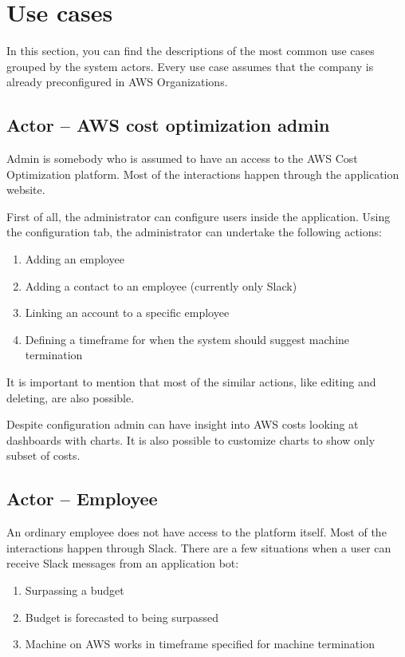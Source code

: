\documentclass[licencjacka,en]{thesisclass}
\begin{document}
    \section{Use cases}

    In this section, you can find the descriptions of the most common use cases
    grouped by the system actors.
    Every use case assumes that the company is already
    preconfigured in AWS Organizations.

    \subsection{Actor -- AWS cost optimization admin}

    Admin is somebody who is assumed to have an access to the AWS Cost Optimization platform.
    Most of the interactions happen through the application website.

    First of all, the administrator can configure users inside the application.
    Using the configuration tab, the administrator can undertake the following actions:

    \begin{enumerate}
        \item Adding an employee
        \item Adding a contact to an employee (currently only Slack)
        \item Linking an account to a specific employee
        \item Defining a timeframe for when the system should suggest machine termination
    \end{enumerate}
    It is important to mention that most of the similar
    actions, like editing and deleting, are also possible.

    Despite configuration admin can have insight into AWS
    costs looking at dashboards with charts.
    It is also possible to customize charts to show only subset of costs.

    \subsection{Actor -- Employee}
    An ordinary employee does not have access to the platform itself.
    Most of the interactions happen through Slack.
    There are a few situations when a user can receive Slack messages from an application bot:

    \begin{enumerate}
        \item Surpassing a budget
        \item Budget is forecasted to being surpassed
        \item Machine on AWS works in timeframe specified for machine termination
    \end{enumerate}
\end{document}
